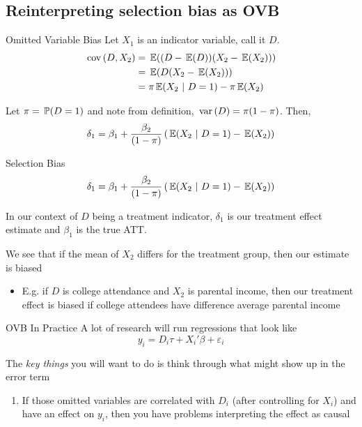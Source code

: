 \documentclass[aspectratio=169,t,11pt,table]{beamer}
\begin{document}
\subsection{Reinterpreting selection bias as OVB}

\begin{frame}{Omitted Variable Bias}
  Let $X_1$ is an indicator variable, call it $D$. 
  \begin{align*}
    \cov{D, X_2} 
    &= \expec{ (D - \expec{D}) (X_2 - \expec{X_2})} \\
    &= \expec{D (X_2 - \expec{X_2})} \\
    &= \pi \expec{X_2}{D = 1} - \pi \expec{X_2}
  \end{align*}

  Let $\pi = \prob{D = 1}$ and note from definition, $\var{D} = \pi (1 - \pi)$. Then,
  $$
    \delta_1 = \beta_1 + \frac{\beta_2}{(1 - \pi)} \left( \expec{X_2}{D = 1} - \expec{X_2} \right)
  $$
\end{frame}

\begin{frame}{Selection Bias}
  \vspace*{-\bigskipamount}
  $$
    \delta_1 = \beta_1 + \frac{\beta_2}{(1 - \pi)} \left( \expec{X_2}{D = 1} - \expec{X_2} \right)
  $$

  \bigskip
  In our context of $D$ being a treatment indicator, $\delta_1$ is our treatment effect estimate and $\beta_1$ is the true ATT.

  \pause
  \bigskip
  We see that if the mean of $X_2$ differs for the treatment group, then our estimate is biased
  \begin{itemize}
    \item E.g. if $D$ is college attendance and $X_2$ is parental income, then our treatment effect is biased if college attendees have difference average parental income
  \end{itemize}
\end{frame}


\begin{frame}{OVB In Practice}
  A lot of research will run regressions that look like 
  $$
    y_i = D_i \tau + X_i' \beta + \varepsilon_i
  $$

  \bigskip
  The \emph{key things} you will want to do is think through what might show up in the error term
  \begin{enumerate}
    \item If those omitted variables are correlated with $D_i$ (after controlling for $X_i$) and have an effect on $y_i$, then you have problems interpreting the effect as causal
  \end{enumerate}
\end{frame}
\end{document}
